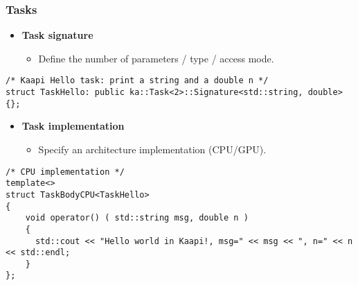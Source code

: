 \begin{frame}[fragile]
  \frametitle{Tasks}
  \begin{itemize}
  \item {\bf Task signature}
    \begin{itemize}
    \item Define the number of parameters / type / access mode.
    \end{itemize}
  \end{itemize}
  \vspace*{-4mm}
\begin{block}{}
\begin{lstlisting}
/* Kaapi Hello task: print a string and a double n */
struct TaskHello: public ka::Task<2>::Signature<std::string, double> {};
\end{lstlisting}
\end{block}
%
\pause
%
  \begin{itemize}
  \item {\bf Task implementation}
    \begin{itemize}
    \item Specify an architecture implementation (CPU/GPU).
    \end{itemize}
  \end{itemize}
  \vspace*{-4mm}
\begin{block}{}
\begin{lstlisting}
/* CPU implementation */
template<>
struct TaskBodyCPU<TaskHello> 
{
    void operator() ( std::string msg, double n )
    {
      std::cout << "Hello world in Kaapi!, msg=" << msg << ", n=" << n << std::endl;
    }
};
\end{lstlisting}
\end{block}
%
\end{frame}
